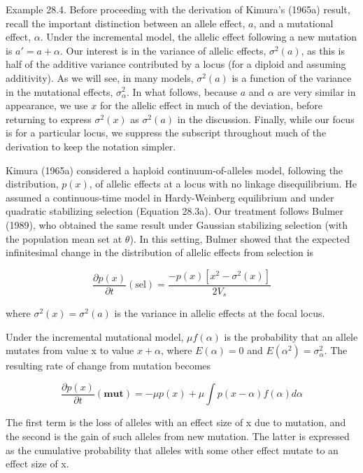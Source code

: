 \documentclass{article}
\begin{document}
Example 28.4. Before proceeding with the derivation of Kimura’s (1965a) result, recall the important distinction between an allele effect, $a$, and a mutational effect, $\alpha$. Under the incremental model, the allelic effect following a new mutation is $a' = a + \alpha$. Our interest is in the variance of allelic effects, $\sigma^2(a)$, as this is half of the additive variance contributed by a locus (for a diploid and assuming additivity). As we will see, in many models, $\sigma^2(a)$ is a function of the variance in the mutational effects, $\sigma_\alpha^2$. In what follows, because $a$ and $\alpha$ are very similar in appearance, we use $x$ for the allelic effect in much of the deviation, before returning to express $\sigma^2(x)$ as $\sigma^2(a)$ in the discussion. Finally, while our focus is for a particular locus, we suppress the subscript throughout much of the derivation to keep the notation simpler.

Kimura (1965a) considered a haploid continuum-of-alleles model, following the distribution,  $ p(x) $, of allelic effects at a locus with no linkage disequilibrium. He assumed a continuous-time model in Hardy-Weinberg equilibrium and under quadratic stabilizing selection (Equation 28.3a). Our treatment follows Bulmer (1989), who obtained the same result under Gaussian stabilizing selection (with the population mean set at  $ \theta $). In this setting, Bulmer showed that the expected infinitesimal change in the distribution of allelic effects from selection is

\begin{equation}
\frac{\partial p(x)}{\partial t}(\mathrm{sel})=\frac{-p(x)[x^{2}-\sigma^{2}(x)]}{2V_{s}}
\tag{28.21a}
\label{eq:28_21a}
\end{equation}

where  $ \sigma^{2}(x)=\sigma^{2}(a) $ is the variance in allelic effects at the focal locus.

Under the incremental mutational model,  $ \mu f(\alpha) $ is the probability that an allele mutates from value x to value  $ x + \alpha $, where  $ E(\alpha) = 0 $ and  $ E(\alpha^2) = \sigma_\alpha^2 $. The resulting rate of change from mutation becomes

\begin{equation}
\frac{\partial p(x)}{\partial t}(\mathbf{m u t})=-\mu p(x)+\mu\int p(x-\alpha)f(\alpha)d\alpha
\tag{28.21b}
\label{eq:28_21b}
\end{equation}

The first term is the loss of alleles with an effect size of x due to mutation, and the second is the gain of such alleles from new mutation. The latter is expressed as the cumulative probability that alleles with some other effect mutate to an effect size of x.
\end{document}
